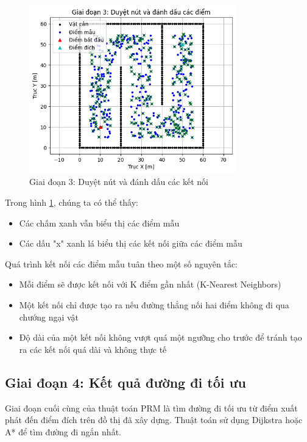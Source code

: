 \documentclass[12pt,a4paper,openany,oneside]{report}
\begin{document}
\begin{figure}[H]
    \centering
    \includegraphics[width=0.8\textwidth]{giai_doan_3}
    \caption{Giai đoạn 3: Duyệt nút và đánh dấu các kết nối}
    \label{fig:stage3}
\end{figure}

Trong hình \ref{fig:stage3}, chúng ta có thể thấy:
\begin{itemize}
    \item Các chấm xanh vẫn biểu thị các điểm mẫu
    \item Các dấu "x" xanh lá biểu thị các kết nối giữa các điểm mẫu
\end{itemize}

Quá trình kết nối các điểm mẫu tuân theo một số nguyên tắc:
\begin{itemize}
    \item Mỗi điểm sẽ được kết nối với K điểm gần nhất (K-Nearest Neighbors)
    \item Một kết nối chỉ được tạo ra nếu đường thẳng nối hai điểm không đi qua chướng ngại vật
    \item Độ dài của một kết nối không vượt quá một ngưỡng cho trước để tránh tạo ra các kết nối quá dài và không thực tế
\end{itemize}

\subsection{Giai đoạn 4: Kết quả đường đi tối ưu}

Giai đoạn cuối cùng của thuật toán PRM là tìm đường đi tối ưu từ điểm xuất phát đến điểm đích trên đồ thị đã xây dựng. Thuật toán sử dụng Dijkstra hoặc A* để tìm đường đi ngắn nhất.
\end{document}
